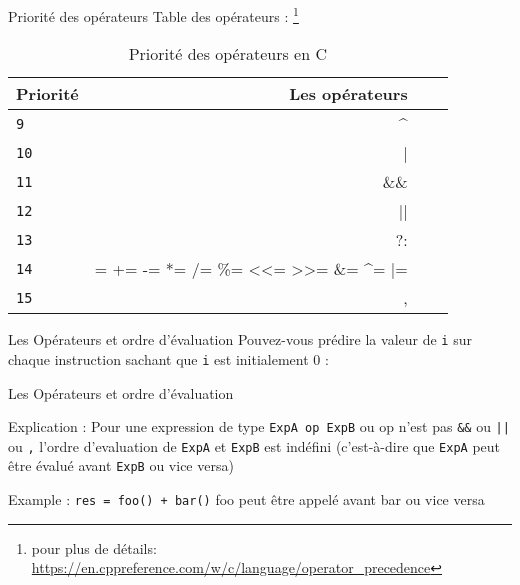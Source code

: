 \documentclass{beamer}
\begin{document}
\begin{darkframes}
  	\begin{frame}{Priorité des opérateurs}
  		Table des opérateurs : \footnote[frame]{pour plus de détails: \url{https://en.cppreference.com/w/c/language/operator_precedence}}
  		\begin{table}[!b]
  			{\carlitoTLF %
  				\begin{tabularx}{\textwidth}{Xrrr}
  					\textbf{Priorité} & \textbf{Les opérateurs} \\
  					\toprule
  					\texttt{9} & \textasciicircum		\\
  					\texttt{10} & |						\\
  					\texttt{11} & \&\&					\\
  					\texttt{12} & ||					\\
  					\texttt{13} & ?:					\\
  					\texttt{14} & = += -= *= /= \%=	<{}<= >{}>= \&= \textasciicircum= |= \\
  					\texttt{15} & , \\
  					\bottomrule
  			\end{tabularx}}
  			\caption{Priorité des opérateurs en C}
  		\end{table}  	
  	\end{frame}
  

  	\begin{frame}{Les Opérateurs et ordre d'évaluation}
  		Pouvez-vous prédire la valeur de \texttt{i} sur chaque instruction sachant que \texttt{i} est initialement $0$ :
  		\opOrderUB
  	\end{frame}
  	
  	\begin{frame}{Les Opérateurs et ordre d'évaluation}
  		\opOrderUBSolution
  		\begin{alertblock}{Explication :}
  			Pour une expression de type \texttt{ExpA \alert{op} ExpB} ou \alert{op} n'est pas \texttt{\alert{\&\&}} ou \texttt{\alert{||}} ou \texttt{\alert{,}} l'ordre d'evaluation de \texttt{ExpA} et \texttt{ExpB} est indéfini (c'est-à-dire que \texttt{ExpA} peut être évalué avant \texttt{ExpB} ou vice versa)
  		\end{alertblock}
  		\begin{exampleblock}{Example :}
  			\texttt{res = foo() + bar()} foo peut être appelé avant bar ou vice versa
  		\end{exampleblock}
  	\end{frame}
  	

\end{darkframes}
\end{document}
